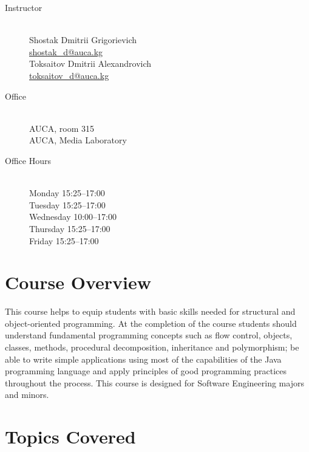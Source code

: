 \documentclass[12pt,a4paper,oneside]{article}
\begin{document}
        \begin{description}
            \item[Instructor]\hfill\\
                Shostak Dmitrii Grigorievich\\
                \href{mailto:shostak_d@auca.kg}{shostak\_d@auca.kg}\\
                Toksaitov Dmitrii Alexandrovich\\
                \href{mailto:toksaitov_d@auca.kg}{toksaitov\_d@auca.kg}
            \item[Office]\hfill\\
                AUCA, room 315\\
                AUCA, Media Laboratory
            \item[Office Hours]\hfill\\
                Monday 15:25--17:00\\
                Tuesday 15:25--17:00\\
                Wednesday 10:00--17:00\\
                Thursday 15:25--17:00\\
                Friday 15:25--17:00
        \end{description}

    \section{Course Overview}

        This course helps to equip students with basic skills needed for
        structural and object-oriented programming. At the completion of the
        course students should understand fundamental programming concepts such
        as flow control, objects, classes, methods, procedural decomposition,
        inheritance and polymorphism; be able to write simple applications using
        most of the capabilities of the Java programming language and apply
        principles of good programming practices throughout the process.  This
        course is designed for Software Engineering majors and minors.

    \section{Topics Covered}
\end{document}
